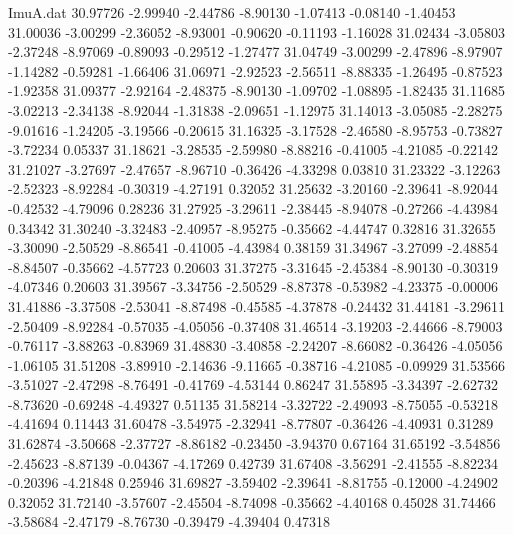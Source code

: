 \begin{filecontents}{ImuA.dat}
  30.97726   -2.99940   -2.44786   -8.90130   -1.07413   -0.08140   -1.40453
  31.00036   -3.00299   -2.36052   -8.93001   -0.90620   -0.11193   -1.16028
  31.02434   -3.05803   -2.37248   -8.97069   -0.89093   -0.29512   -1.27477
  31.04749   -3.00299   -2.47896   -8.97907   -1.14282   -0.59281   -1.66406
  31.06971   -2.92523   -2.56511   -8.88335   -1.26495   -0.87523   -1.92358
  31.09377   -2.92164   -2.48375   -8.90130   -1.09702   -1.08895   -1.82435
  31.11685   -3.02213   -2.34138   -8.92044   -1.31838   -2.09651   -1.12975
  31.14013   -3.05085   -2.28275   -9.01616   -1.24205   -3.19566   -0.20615
  31.16325   -3.17528   -2.46580   -8.95753   -0.73827   -3.72234    0.05337
  31.18621   -3.28535   -2.59980   -8.88216   -0.41005   -4.21085   -0.22142
  31.21027   -3.27697   -2.47657   -8.96710   -0.36426   -4.33298    0.03810
  31.23322   -3.12263   -2.52323   -8.92284   -0.30319   -4.27191    0.32052
  31.25632   -3.20160   -2.39641   -8.92044   -0.42532   -4.79096    0.28236
  31.27925   -3.29611   -2.38445   -8.94078   -0.27266   -4.43984    0.34342
  31.30240   -3.32483   -2.40957   -8.95275   -0.35662   -4.44747    0.32816
  31.32655   -3.30090   -2.50529   -8.86541   -0.41005   -4.43984    0.38159
  31.34967   -3.27099   -2.48854   -8.84507   -0.35662   -4.57723    0.20603
  31.37275   -3.31645   -2.45384   -8.90130   -0.30319   -4.07346    0.20603
  31.39567   -3.34756   -2.50529   -8.87378   -0.53982   -4.23375   -0.00006
  31.41886   -3.37508   -2.53041   -8.87498   -0.45585   -4.37878   -0.24432
  31.44181   -3.29611   -2.50409   -8.92284   -0.57035   -4.05056   -0.37408
  31.46514   -3.19203   -2.44666   -8.79003   -0.76117   -3.88263   -0.83969
  31.48830   -3.40858   -2.24207   -8.66082   -0.36426   -4.05056   -1.06105
  31.51208   -3.89910   -2.14636   -9.11665   -0.38716   -4.21085   -0.09929
  31.53566   -3.51027   -2.47298   -8.76491   -0.41769   -4.53144    0.86247
  31.55895   -3.34397   -2.62732   -8.73620   -0.69248   -4.49327    0.51135
  31.58214   -3.32722   -2.49093   -8.75055   -0.53218   -4.41694    0.11443
  31.60478   -3.54975   -2.32941   -8.77807   -0.36426   -4.40931    0.31289
  31.62874   -3.50668   -2.37727   -8.86182   -0.23450   -3.94370    0.67164
  31.65192   -3.54856   -2.45623   -8.87139   -0.04367   -4.17269    0.42739
  31.67408   -3.56291   -2.41555   -8.82234   -0.20396   -4.21848    0.25946
  31.69827   -3.59402   -2.39641   -8.81755   -0.12000   -4.24902    0.32052
  31.72140   -3.57607   -2.45504   -8.74098   -0.35662   -4.40168    0.45028
  31.74466   -3.58684   -2.47179   -8.76730   -0.39479   -4.39404    0.47318

\end{filecontents}
